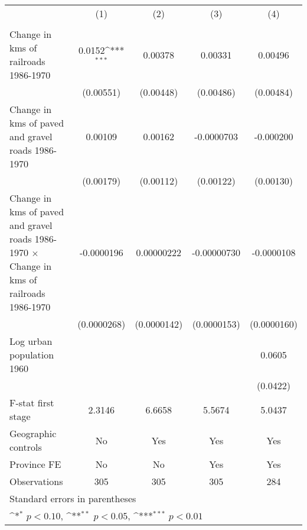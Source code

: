 {
\def\sym#1{\ifmmode^{#1}\else\(^{#1}\)\fi}
\begin{tabular}{l*{4}{c}}
\hline\hline
                &\multicolumn{1}{c}{(1)}&\multicolumn{1}{c}{(2)}&\multicolumn{1}{c}{(3)}&\multicolumn{1}{c}{(4)}\\
                &\multicolumn{1}{c}{}&\multicolumn{1}{c}{}&\multicolumn{1}{c}{}&\multicolumn{1}{c}{}\\
\hline
Change in kms of railroads 1986-1970&   0.0152\sym{***}&  0.00378         &  0.00331         &  0.00496         \\
                &(0.00551)         &(0.00448)         &(0.00486)         &(0.00484)         \\
[1em]
Change in kms of paved and gravel roads 1986-1970&  0.00109         &  0.00162         &-0.0000703         &-0.000200         \\
                &(0.00179)         &(0.00112)         &(0.00122)         &(0.00130)         \\
[1em]
Change in kms of paved and gravel roads 1986-1970 $\times$ Change in kms of railroads 1986-1970&-0.0000196         &0.00000222         &-0.00000730         &-0.0000108         \\
                &(0.0000268)         &(0.0000142)         &(0.0000153)         &(0.0000160)         \\
[1em]
Log urban population 1960&                  &                  &                  &   0.0605         \\
                &                  &                  &                  & (0.0422)         \\
\hline
F-stat first stage&   2.3146         &   6.6658         &   5.5674         &   5.0437         \\
Geographic controls&       No         &      Yes         &      Yes         &      Yes         \\
Province FE     &       No         &       No         &      Yes         &      Yes         \\
Observations    &      305         &      305         &      305         &      284         \\
\hline\hline
\multicolumn{5}{l}{\footnotesize Standard errors in parentheses}\\
\multicolumn{5}{l}{\footnotesize \sym{*} \(p<0.10\), \sym{**} \(p<0.05\), \sym{***} \(p<0.01\)}\\
\end{tabular}
}
